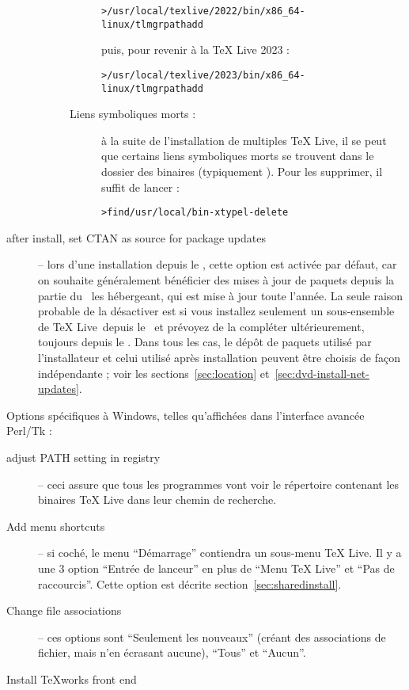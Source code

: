 \documentclass[german, english, french]{article}
\renewcommand{\TL}{\TeX{} Live\xspace}%
\begin{document}
\begin{description}
\begin{description}
\begin{description}
\begin{alltt}
> /usr/local/texlive/2022/bin/x86_64-linux/tlmgr path add
\end{alltt}
      puis, pour revenir à la \TL{} 2023 :
\begin{alltt}
> /usr/local/texlive/2023/bin/x86_64-linux/tlmgr path add
\end{alltt}
    \item[Liens symboliques morts :] à la suite de l'installation de multiples
      \TL{}, il se peut que certains liens symboliques morts se trouvent dans le
      dossier des binaires (typiquement ). Pour les
      supprimer, il suffit de lancer :
\begin{alltt}
> find /usr/local/bin -xtype l -delete
\end{alltt}
    \end{description}
  \end{description}

\item[after install, set CTAN as source for package updates] -- lors d'une
  installation depuis le \DVD, cette option est activée par défaut, car on
  souhaite généralement bénéficier des mises à jour de paquets depuis la partie
  du \CTAN\ les hébergeant, qui est mise à jour toute l'année. La seule raison
  probable de la désactiver est si vous installez seulement un sous-ensemble de
  \TL\ depuis le \DVD\ et prévoyez de la compléter ultérieurement, toujours
  depuis le \DVD. Dans tous les cas, le dépôt de paquets utilisé par
  l'installateur et celui utilisé après installation peuvent être choisis de
  façon indépendante ; voir les sections~\ref{sec:location}
  et~\ref{sec:dvd-install-net-updates}.
\end{description}

Options spécifiques à Windows, telles qu'affichées dans l'interface avancée
Perl/Tk :
\begin{description}
\item[adjust PATH setting in registry] -- ceci assure que tous les programmes
  vont voir le répertoire contenant les binaires \TL{} dans leur chemin de
  recherche.

\item[Add menu shortcuts] -- si coché, le menu \enquote{Démarrage} contiendra un
  sous-menu \TL{}. Il y a une 3\ieme{} option \enquote{Entrée de lanceur} en
  plus de \enquote{Menu \TL{}} et \enquote{Pas de raccourcis}. Cette option est
  décrite section~\ref{sec:sharedinstall}.

\item[Change file associations] -- ces options sont \enquote{Seulement les
    nouveaux} (créant des associations de fichier, mais n'en écrasant aucune),
  \enquote{Tous} et \enquote{Aucun}.

\item[Install \TeX{}works front end]
\end{description}
\end{document}
